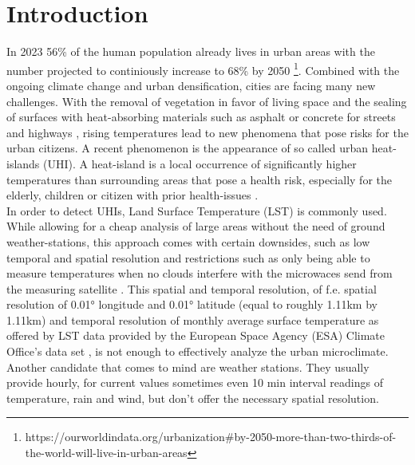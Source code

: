
\chapter{Introduction}
\label{chap:Introduction}

 In 2023 56\% of the human population already lives in urban areas with the number projected to continiously increase to 68\% by 2050 \footnote{https://ourworldindata.org/urbanization\#by-2050-more-than-two-thirds-of-the-world-will-live-in-urban-areas}. Combined with the ongoing climate change and urban densification, cities are facing many new challenges. With the removal of vegetation in favor of living space and the sealing of surfaces with heat-absorbing materials such as asphalt or concrete for streets and highways \cite{gret2020urban}, rising temperatures lead to new phenomena that pose risks for the urban citizens. A recent phenomenon is the appearance of so called urban heat-islands (UHI). A heat-island is a local occurrence of significantly higher temperatures than surrounding areas that pose a health risk, especially for the elderly, children or citizen with prior health-issues \cite{martin2015alternative}.\\
In order to detect UHIs, Land Surface Temperature (LST) is commonly used. While allowing for a cheap analysis of large areas without the need of ground weather-stations, this approach comes with certain downsides, such as low temporal and spatial resolution and restrictions such as only being able to measure temperatures when no clouds interfere with the microwaces send from the measuring satellite \cite{zhang2015estimation}. This spatial and temporal resolution, of f.e. spatial resolution of 0.01° longitude and 0.01° latitude (equal to roughly 1.11km by 1.11km) and temporal resolution of monthly average surface temperature as offered by LST data provided by the European Space Agency (ESA) Climate Office's data set \cite{ghent2022esalst}, is not enough to effectively analyze the urban microclimate. Another candidate that comes to mind are weather stations. They usually provide hourly, for current values sometimes even 10 min interval readings of temperature, rain and wind, but don't offer the necessary spatial resolution.
